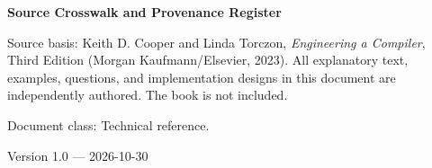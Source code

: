 \documentclass[10pt,letterpaper]{article}
\begin{document}
\begin{titlepage}
\centering\vspace*{1.0in}
{\Huge\bfseries\textcolor{CompilerBlue}{Source Crosswalk and Provenance Register}\par}
\vspace{.22in}{\Large Fourteen chapters, appendices and suite artifact references\par}
\vspace{.4in}{\large Compiler Engineering Documentation Suite\par}
\vfill
\begin{minipage}{.86\linewidth}\small
Source basis: Keith D. Cooper and Linda Torczon, \emph{Engineering a Compiler}, Third Edition (Morgan Kaufmann/Elsevier, 2023). All explanatory text, examples, questions, and implementation designs in this document are independently authored. The book is not included.\par\medskip
Document class: Technical reference.
\end{minipage}
\vfill\textcolor{CompilerGray}{Version 1.0 --- 2026-10-30}\par
\end{titlepage}
\tableofcontents\clearpage
\end{document}
